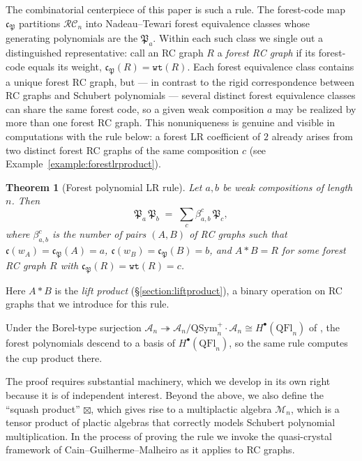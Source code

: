 \documentclass[a4paper,fleqn]{cas-sc}
\newtheorem{theorem}{Theorem}[section]
\theoremstyle{definition}
\theoremstyle{remark}
\numberwithin{equation}{subsection}
\newcommand{\wof}[1]{w_{#1}}
\newcommand{\wtt}{\mathtt{wt}}
\newcommand{\RC}{\mathcal{RC}}
\newcommand{\coma}{\mathcal{A}}
\newcommand{\code}{\mathfrak{c}}
\newcommand{\forest}{\mathfrak{P}}
\begin{document}
The combinatorial centerpiece of this paper is such a rule. The forest-code map $\code_\forest$ partitions $\RC_n$ into Nadeau--Tewari forest equivalence classes whose generating polynomials are the $\forest_a$. Within each such class we single out a distinguished representative: call an RC graph $R$ a \emph{forest RC graph} if its forest-code equals its weight, $\code_\forest(R) = \wtt(R)$. Each forest equivalence class contains a unique forest RC graph, but --- in contrast to the rigid correspondence between RC graphs and Schubert polynomials --- several distinct forest equivalence classes can share the same forest code, so a given weak composition $a$ may be realized by more than one forest RC graph. This nonuniqueness is genuine and visible in computations with the rule below: a forest LR coefficient of $2$ already arises from two distinct forest RC graphs of the same composition $c$ (see Example~\ref{example:forestlrproduct}).

\begin{theorem}[Forest polynomial LR rule]\label{theorem:forestpolyLR}
Let $a,b$ be weak compositions of length $n$. Then
$$\forest_a\,\forest_b \;=\; \sum_c \beta_{a,b}^c\,\forest_c,$$
where $\beta_{a,b}^c$ is the number of pairs $(A,B)$ of RC graphs such that $\code(\wof{A}) = \code_\forest(A) = a$, $\code(\wof{B}) = \code_\forest(B) = b$, and $A*B = R$ for some forest RC graph $R$ with $\code_\forest(R) = \wtt(R) = c$.
\end{theorem}
Here $A*B$ is the \emph{lift product} (\S\ref{section:liftproduct}), a binary operation on RC graphs that we introduce for this rule.


Under the Borel-type surjection $\coma_n\twoheadrightarrow \coma_n/\mathrm{QSym}_n^+\cdot\coma_n\cong H^\bullet(\mathrm{QFl}_n)$ of \cite{bergeron2025qsymflag}, the forest polynomials descend to a basis of $H^\bullet(\mathrm{QFl}_n)$, so the same rule computes the cup product there.



The proof requires substantial machinery, which we develop in its own right because it is of independent interest. Beyond the above, we also define the ``squash product'' $\boxtimes$, which gives rise to a multiplactic algebra $\mathcal{M}_n$, which is a tensor product of plactic algebras that correctly models Schubert polynomial multiplication. In the process of proving the rule we invoke the quasi-crystal framework of Cain--Guilherme--Malheiro \cite{cain2023quasicrystals} as it applies to RC graphs. 
\end{document}
